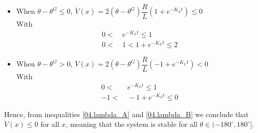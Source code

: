 \begin{itemize}
  \item When $\theta - \theta^G \leq 0$, $\dot{V}(x) = 2 (\theta - \theta^G) \dfrac{R}{L} (1 + e^{-K_L t}) \leq 0$ \\
    With
    \begin{align}
      0 <&\ e^{-K_L t} \leq 1 \nonumber \\
      0 <&\ 1 < 1 + e^{-K_L t} \leq 2 \label{04.lambda_A}
    \end{align}
  \item When $\theta - \theta^G > 0$, $\dot{V}(x) = 2 (\theta - \theta^G) \dfrac{R}{L} (-1 + e^{-K_L t}) < 0$  \\
    With
    \begin{align}
      0 <&\ e^{-K_L t} \leq 1 \nonumber \\
      -1 <&\ -1 + e^{-K_L t} \leq 0 \label{04.lambda_B}
    \end{align}
\end{itemize}


Hence, from inequalities \ref{04.lambda_A} and \ref{04.lambda_B} we conclude
that $\dot{V}(x) \leq 0$ for all $x$, meaning that the system is stable for all
$\theta \in (-180^{\circ}, 180^{\circ}]$.

\begin{figure}[H]\centering
  \scalebox{0.9}{}
  \caption{}
  \label{fig:04}
\end{figure}
